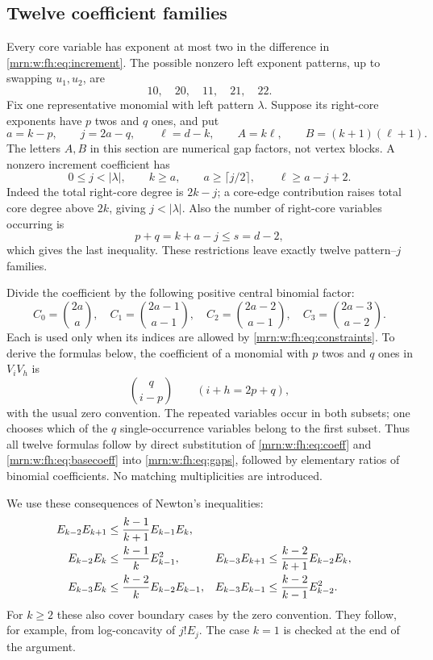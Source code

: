\documentclass[11pt,a4paper]{article}
\theoremstyle{remark}\newtheorem{remark}[theorem]{Remark}
\begin{document}
\subsection{Twelve coefficient families}
Every core variable has exponent at most two in the difference in \eqref{mrn:w:fh:eq:increment}. The possible nonzero left exponent patterns, up to swapping $u_1,u_2$, are
\[
 10,\quad20,\quad11,\quad21,\quad22.
\]
Fix one representative monomial with left pattern $\lambda$. Suppose its right-core exponents have $p$ twos and $q$ ones, and put
\[
 a=k-p,\qquad j=2a-q,\qquad \ell=d-k,\qquad
 A=k\ell,\qquad B=(k+1)(\ell+1).
\]
The letters $A,B$ in this section are numerical gap factors, not vertex blocks. A nonzero increment coefficient has
\begin{equation}\label{mrn:w:fh:eq:constraints}
 0\le j<|\lambda|,\qquad k\ge a,\qquad
 a\ge\lceil j/2\rceil,\qquad \ell\ge a-j+2.
\end{equation}
Indeed the total right-core degree is $2k-j$; a core-edge contribution raises total core degree above $2k$, giving $j<|\lambda|$. Also the number of right-core variables occurring is
\[
 p+q=k+a-j\le s=d-2,
\]
which gives the last inequality. These restrictions leave exactly twelve pattern--$j$ families.

Divide the coefficient by the following positive central binomial factor:
\[
 C_0=\binom{2a}{a},\quad
 C_1=\binom{2a-1}{a-1},\quad
 C_2=\binom{2a-2}{a-1},\quad
 C_3=\binom{2a-3}{a-2}.
\]
Each is used only when its indices are allowed by \eqref{mrn:w:fh:eq:constraints}. To derive the formulas below, the coefficient of a monomial with $p$ twos and $q$ ones in $V_iV_h$ is
\begin{equation}\label{mrn:w:fh:eq:bincoef}
 \binom q{i-p}\qquad(i+h=2p+q),
\end{equation}
with the usual zero convention. The repeated variables occur in both subsets; one chooses which of the $q$ single-occurrence variables belong to the first subset. Thus all twelve formulas follow by direct substitution of \eqref{mrn:w:fh:eq:coeff} and \eqref{mrn:w:fh:eq:basecoeff} into \eqref{mrn:w:fh:eq:gaps}, followed by elementary ratios of binomial coefficients. No matching multiplicities are introduced.

We use these consequences of Newton's inequalities:
\begin{align}
 E_{k-2}E_{k+1}&\le\frac{k-1}{k+1}E_{k-1}E_k,\notag\\
 E_{k-2}E_k&\le\frac{k-1}{k}E_{k-1}^2,&
 E_{k-3}E_{k+1}&\le\frac{k-2}{k+1}E_{k-2}E_k,\label{mrn:w:fh:eq:Newton}\\
 E_{k-3}E_k&\le\frac{k-2}{k}E_{k-2}E_{k-1},&
 E_{k-3}E_{k-1}&\le\frac{k-2}{k-1}E_{k-2}^2.\notag
\end{align}
For $k\ge2$ these also cover boundary cases by the zero convention. They follow, for example, from log-concavity of $j!E_j$. The case $k=1$ is checked at the end of the argument.
\end{document}
